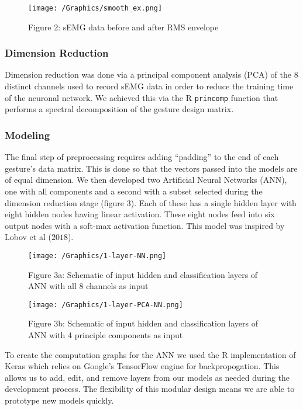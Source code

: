 \documentclass[]{article}
\begin{document}
\begin{figure}
\centering
\texttt{[image: /Graphics/smooth\_ex.png]}
\caption{Figure 2: sEMG data before and after RMS envelope}
\end{figure}

\subsubsection{Dimension Reduction}\label{dimension-reduction}

Dimension reduction was done via a principal component analysis (PCA) of
the 8 distinct channels used to record sEMG data in order to reduce the
training time of the neuronal network. We achieved this via the R
\texttt{princomp} function that performs a spectral decomposition of the
gesture design matrix.

\subsubsection{Modeling}\label{modeling}

The final step of preprocessing requires adding ``padding'' to the end
of each gesture's data matrix. This is done so that the vectors passed
into the models are of equal dimension. We then developed two Artificial
Neural Networks (ANN), one with all components and a second with a
subset selected during the dimension reduction stage (figure \(3\)).
Each of these has a single hidden layer with eight hidden nodes having
linear activation. These eight nodes feed into six output nodes with a
soft-max activation function. This model was inspired by Lobov et al
(\(2018\)).

\begin{figure}
\centering
\texttt{[image: /Graphics/1-layer-NN.png]}
\caption{Figure 3a: Schematic of input hidden and classification layers
of ANN with all 8 channels as input}
\end{figure}

\begin{figure}
\centering
\texttt{[image: /Graphics/1-layer-PCA-NN.png]}
\caption{Figure 3b: Schematic of input hidden and classification layers
of ANN with 4 principle components as input}
\end{figure}

To create the computation graphs for the ANN we used the R
implementation of Keras which relies on Google's TensorFlow engine for
backpropogation. This allows us to add, edit, and remove layers from our
models as needed during the development process. The flexibility of this
modular design means we are able to prototype new models quickly.
\end{document}
